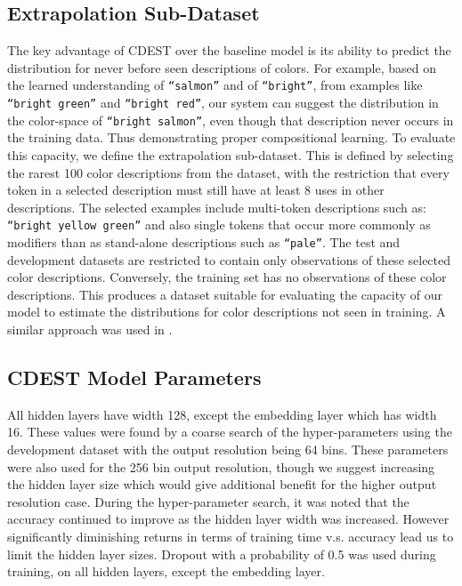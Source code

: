 \documentclass[11pt,a4paper]{article}
\newcommand{\parencite}{\citep}
\newcommand{\textcite}{\citet}
\begin{document}
\subsection{Extrapolation Sub-Dataset} \label{sec:extrapodataset}
The key advantage of CDEST over the baseline model is its ability to predict the distribution for never before seen descriptions of colors.
For example, based on the learned understanding of \texttt{``salmon''} and of \texttt{``bright''}, from examples like \texttt{``bright green''} and \texttt{``bright red''}, our system can suggest the distribution in the color-space of \texttt{``bright salmon''}, even though that description never occurs in the training data.
Thus demonstrating proper compositional learning.
%
To evaluate this capacity, we define the extrapolation sub-dataset.
This is defined by selecting the rarest 100 color descriptions from the dataset,
with the restriction that every token in a selected description must still have at least 8 uses in other descriptions.
The selected examples include multi-token descriptions such as: \texttt{``bright yellow green''} and also single tokens that occur more commonly as modifiers than as stand-alone descriptions such as \texttt{``pale''}.
The test and development datasets are restricted to contain only observations of these selected color descriptions.
Conversely, the training set has no observations of these color descriptions.
This produces a dataset suitable for evaluating the capacity of our model to estimate the distributions for color descriptions not seen in training.
A similar approach was used in \textcite{DBLP:journals/corr/AtzmonBKGC16}.

\subsection{CDEST Model Parameters}
All hidden layers have width 128, except the embedding layer which has width 16.
These values were found by a coarse search of the hyper-parameters using the development dataset with the output resolution being 64 bins.
These parameters were also used for the 256 bin output resolution, though we suggest increasing the hidden layer size which would give additional benefit for the higher output resolution case.
During the hyper-parameter search, it was noted that the accuracy continued to improve as the hidden layer width was increased.
However significantly diminishing returns in terms of training time v.s. accuracy lead us to limit the hidden layer sizes.
Dropout \parencite{srivastava2014dropout} with a probability of 0.5 was used during training, on all hidden layers, except the embedding layer.
\end{document}

